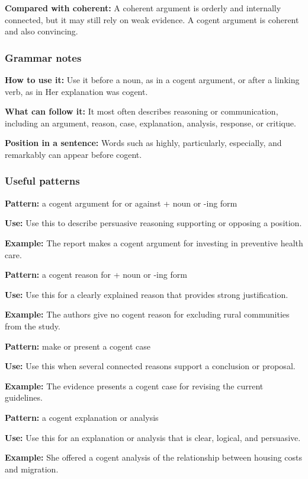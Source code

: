 \documentclass[11pt]{article}
\begin{document}
\textbf{Compared with coherent:} A coherent argument is orderly and internally connected, but it may still rely on weak evidence. A cogent argument is coherent and also convincing.

\subsubsection{Grammar notes}
\textbf{How to use it:} Use it before a noun, as in a cogent argument, or after a linking verb, as in Her explanation was cogent.

\textbf{What can follow it:} It most often describes reasoning or communication, including an argument, reason, case, explanation, analysis, response, or critique.

\textbf{Position in a sentence:} Words such as highly, particularly, especially, and remarkably can appear before cogent.

\subsubsection{Useful patterns}
\textbf{Pattern:} a cogent argument for or against + noun or -ing form

\textbf{Use:} Use this to describe persuasive reasoning supporting or opposing a position.

\textbf{Example:} The report makes a cogent argument for investing in preventive health care.

\textbf{Pattern:} a cogent reason for + noun or -ing form

\textbf{Use:} Use this for a clearly explained reason that provides strong justification.

\textbf{Example:} The authors give no cogent reason for excluding rural communities from the study.

\textbf{Pattern:} make or present a cogent case

\textbf{Use:} Use this when several connected reasons support a conclusion or proposal.

\textbf{Example:} The evidence presents a cogent case for revising the current guidelines.

\textbf{Pattern:} a cogent explanation or analysis

\textbf{Use:} Use this for an explanation or analysis that is clear, logical, and persuasive.

\textbf{Example:} She offered a cogent analysis of the relationship between housing costs and migration.
\end{document}
